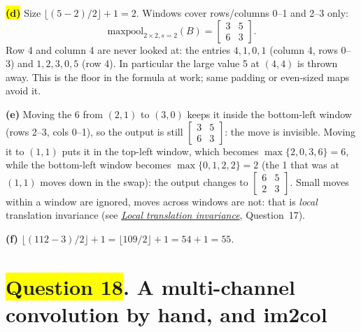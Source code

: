 \documentclass[12pt,a4paper]{article}
\newcommand{\seeconcept}[3]{(see \hyperref[#1]{\textit{#2}}, Question~#3)}
\newcommand{\hlq}[1]{{\setlength{\fboxsep}{1.5pt}\colorbox{yellow}{#1}}}
\begin{document}
\hlq{\textbf{(d)}} Size $\lfloor(5-2)/2\rfloor+1=2$. Windows cover rows/columns 0--1 and 2--3 only:
\[
\text{maxpool}_{2\times2,s=2}(B)=\begin{bmatrix}3&5\\6&3\end{bmatrix}.
\]
Row 4 and column 4 are never looked at: the entries $4,1,0,1$ (column 4, rows 0--3) and $1,2,3,0,5$ (row 4). In particular the large value 5 at $(4,4)$ is thrown away. This is the floor in the formula at work; same padding or even-sized maps avoid it.

\textbf{(e)} Moving the 6 from $(2,1)$ to $(3,0)$ keeps it inside the bottom-left window (rows 2--3, cols 0--1), so the output is still $\begin{bmatrix}3&5\\6&3\end{bmatrix}$: the move is invisible. Moving it to $(1,1)$ puts it in the top-left window, which becomes $\max\{2,0,3,6\}=6$, while the bottom-left window becomes $\max\{0,1,2,2\}=2$ (the 1 that was at $(1,1)$ moves down in the swap): the output changes to $\begin{bmatrix}6&5\\2&3\end{bmatrix}$. Small moves within a window are ignored, moves across windows are not: that is \emph{local} translation invariance \seeconcept{c:invariance}{Local translation invariance}{17}.

\textbf{(f)} $\lfloor(112-3)/2\rfloor+1=\lfloor109/2\rfloor+1=54+1=55$.

\section[Question 18. A multi-channel convolution by hand, and im2col]{\hlq{Question 18}. A multi-channel convolution by hand, and im2col}
\end{document}
